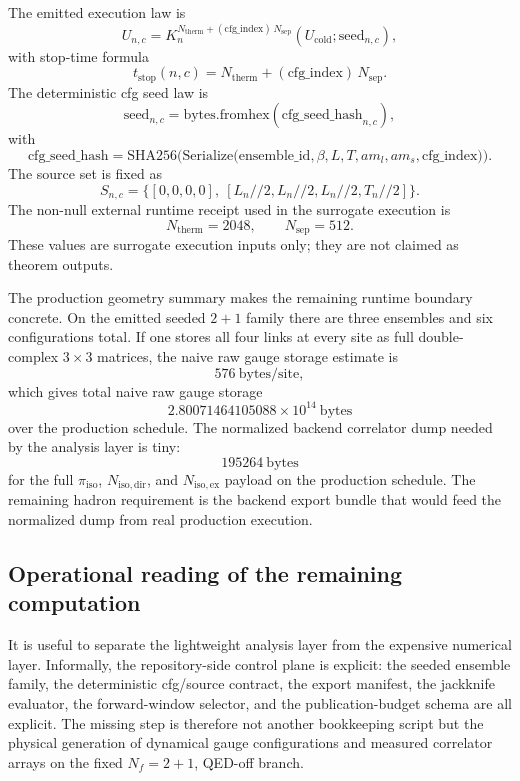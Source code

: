 \documentclass[11pt]{article}
\begin{document}
The emitted execution law is
\[
U_{n,c}
=
K_n^{N_{\mathrm{therm}} + (\mathrm{cfg\_index})\,N_{\mathrm{sep}}}(U_{\mathrm{cold}}; \mathrm{seed}_{n,c}),
\]
with stop-time formula
\[
t_{\mathrm{stop}}(n,c)
=
N_{\mathrm{therm}} + (\mathrm{cfg\_index})\,N_{\mathrm{sep}}.
\]
The deterministic cfg seed law is
\[
\mathrm{seed}_{n,c}
=
\mathrm{bytes.fromhex}(\mathrm{cfg\_seed\_hash}_{n,c}),
\]
with
\[
\mathrm{cfg\_seed\_hash}
=
\mathrm{SHA256}\!\Big(
\mathrm{Serialize}\!\big(
\mathrm{ensemble\_id},\beta,L,T,a m_l,a m_s,\mathrm{cfg\_index}
\big)
\Big).
\]
The source set is fixed as
\[
S_{n,c} = \{ [0,0,0,0],\ [L_n//2, L_n//2, L_n//2, T_n//2] \}.
\]
The non-null external runtime receipt used in the surrogate execution is
\[
N_{\mathrm{therm}} = 2048,
\qquad
N_{\mathrm{sep}} = 512.
\]
These values are surrogate execution inputs only; they are not claimed as theorem outputs.

The production geometry summary makes the remaining runtime boundary concrete. On the emitted
seeded \(2+1\) family there are three ensembles and six configurations total. If one stores all
four links at every site as full double-complex \(3\times 3\) matrices, the naive raw gauge
storage estimate is
\[
576\ \mathrm{bytes/site},
\]
which gives total naive raw gauge storage
\[
2.80071464105088\times 10^{14}\ \mathrm{bytes}
\]
over the production schedule. The normalized backend correlator dump needed by the
analysis layer is tiny:
\[
195264\ \mathrm{bytes}
\]
for the full \(\pi_{\mathrm{iso}}\), \(N_{\mathrm{iso,dir}}\), and \(N_{\mathrm{iso,ex}}\)
payload on the production schedule. The remaining hadron requirement is the backend export bundle
that would feed the normalized dump from real production execution.

\subsection{Operational reading of the remaining computation}

It is useful to separate the lightweight analysis layer from the expensive numerical layer.
Informally, the repository-side control plane is explicit: the seeded ensemble family, the
deterministic cfg/source contract, the export manifest, the jackknife evaluator, the forward-window
selector, and the publication-budget schema are all explicit. The missing step is therefore not
another bookkeeping script but the physical generation of dynamical gauge configurations and
measured correlator arrays on the fixed \(N_f=2+1\), QED-off branch.
\end{document}
